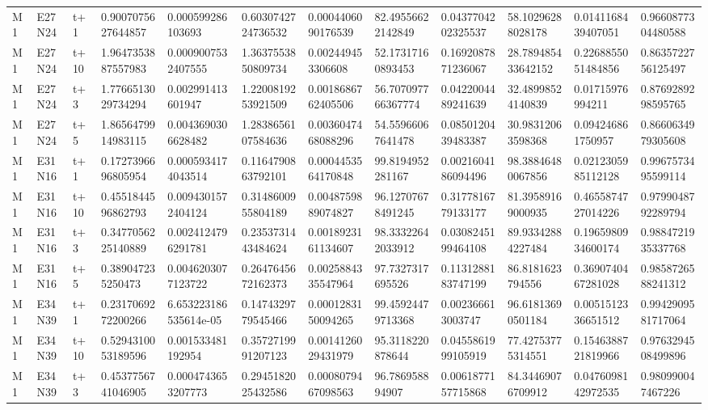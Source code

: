 \begin{landscape}
\begin{longtable}{llllllllllll}
M1 & E27N24 & t+1 & 0.9007075627644857 & 0.000599286103693 & 0.6030742724736532 & 0.0004406090176539 & 82.49556622142849 & 0.0437704202325537 & 58.10296288028178 & 0.0141168439407051 & 0.9660877304480588 \\
M1 & E27N24 & t+10 & 1.9647353887557983 & 0.0009007532407555 & 1.3637553850809734 & 0.002449453306608 & 52.17317160893453 & 0.1692087871236067 & 28.789485433642152 & 0.2268855051484856 & 0.8635722756125497 \\
M1 & E27N24 & t+3 & 1.7766513029734294 & 0.002991413601947 & 1.2200819253921509 & 0.0018686762405506 & 56.707097766367774 & 0.0422004489241639 & 32.48998524140839 & 0.01715976994211 & 0.8769289298595765 \\
M1 & E27N24 & t+5 & 1.8656479914983115 & 0.0043690306628482 & 1.2838656107584636 & 0.0036047468088296 & 54.55966067641478 & 0.0850120439483387 & 30.98312063598368 & 0.094246861750957 & 0.8660634979305608 \\
M1 & E31N16 & t+1 & 0.1727396696805954 & 0.0005934174043514 & 0.1164790863792101 & 0.0004453564170848 & 99.8194952281167 & 0.0021604186094496 & 98.38846480067856 & 0.0212305985112128 & 0.9967573495599114 \\
M1 & E31N16 & t+10 & 0.4551844596862793 & 0.0094301572404124 & 0.3148600955804189 & 0.0048759889074827 & 96.12707678491245 & 0.3177816779133177 & 81.39589169000935 & 0.4655874727014226 & 0.9799048792289794 \\
M1 & E31N16 & t+3 & 0.3477056225140889 & 0.0024124796291781 & 0.2353731443484624 & 0.0018923161134607 & 98.33322642033912 & 0.0308245199464108 & 89.93342884227484 & 0.1965980934600174 & 0.9884721935337768 \\
M1 & E31N16 & t+5 & 0.389047235250473 & 0.0046203077123722 & 0.2647645672162373 & 0.0025884335547964 & 97.7327317695526 & 0.1131288183747199 & 86.8181623794556 & 0.3690740467281028 & 0.9858726588241312 \\
M1 & E34N39 & t+1 & 0.2317069272200266 & 6.653223186535614e-05 & 0.1474329779545466 & 0.0001283150094265 & 99.45924479713368 & 0.002366613003747 & 96.61813690501184 & 0.0051512336651512 & 0.9942909581717064 \\
M1 & E34N39 & t+10 & 0.5294310053189596 & 0.001533481192954 & 0.3572719991207123 & 0.0014126029431979 & 95.3118220878644 & 0.0455861999105919 & 77.42753775314551 & 0.1546388721819966 & 0.9763294508499896 \\
M1 & E34N39 & t+3 & 0.4537756741046905 & 0.0004743653207773 & 0.2945182025432586 & 0.0008079467098563 & 96.786958894907 & 0.0061877157715868 & 84.34469076709912 & 0.0476098142972535 & 0.980990047467226 \\

\end{longtable}
\end{landscape}
